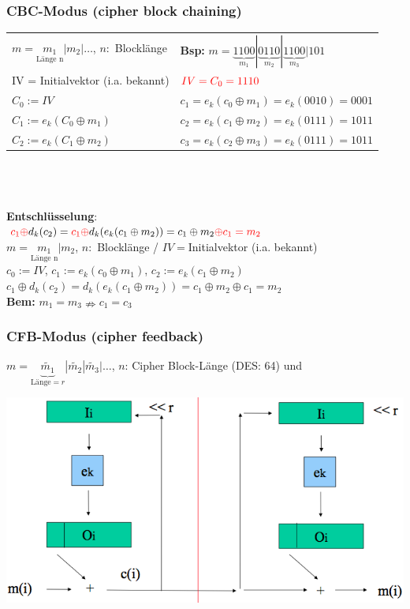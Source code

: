 \documentclass[10pt]{article}
\newcommand{\Bold}[1]{\textbf{#1}} %
\newcommand{\T}[1]{\text{#1}} %
\newcommand{\Unten}[2]{\underset{#1}{#2}} %
\begin{document}
\subsubsection{CBC-Modus (cipher block chaining)}
\begin{tabular}{p{7.5cm}  l}
	$m=\Unten{\T{Länge n}}{m_1}|m_2|\dots$, $n:$ Blocklänge &\Bold{Bsp:} $m=\underbrace{1100}_{m_1} | \underbrace{0110}_{m_2} | \underbrace{1100}_{m_3} | 101$ \\
	{\color{red}IV = Initialvektor} (i.a. bekannt) &  $\color{red}IV=C_0=1110$  \\
	$C_0 := IV$ & $c_1 = e_k(c_0 \oplus m_1) = e_k(0010) = 0001$ \\
	$C_1 := e_k(C_0 \oplus m_1)$ & $c_2 = e_k(c_1 \oplus m_2) = e_k(0111) = 1011$ \\
	$C_2 := e_k(C_1 \oplus m_2)$  & $c_3 = e_k(c_2 \oplus m_3) = e_k(0111) = 1011$ \\
\end{tabular} \\ \\ \\
 \textbf{Entschlüsselung}:  \\
 ${\color{red}c_1\oplus} d_k(c_2)={\color{red}c_1\oplus}d_k(e_k(c_1\oplus m_2))= c_1\oplus m_2 {\color{red}\oplus c_1 = m_2}$ \\
 $m=\Unten{\T{Länge n}}{m_1}|m_2$, $n:$ Blocklänge / $IV=$Initialvektor (i.a. bekannt)\\
 $c_0:=IV$, $c_1:=e_k(c_0\oplus m_1)$, $c_2:=e_k(c_1\oplus m_2)$\\
 $c_1\oplus d_k(c_2)=d_k(e_k(c_1\oplus m_2))=c_1\oplus m_2\oplus c_1=m_2$\\

 \Bold{Bem:} $m_1=m_3\nRightarrow c_1=c_3$
 
\subsubsection{CFB-Modus (cipher feedback)}
 $m=\underbrace{\tilde{m_1}}_{\T{Länge}=r}|\tilde{m_2}|\tilde{m_3}|\dots$, $n$: Cipher Block-Länge (DES: 64) und 
\begin{center}
\includegraphics[scale=0.225]{cfb-encryption.png}
\end{center}
\end{document}
